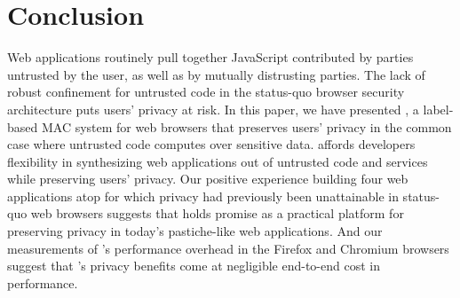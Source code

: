 \section{Conclusion}
\label{sec:conclusion}

Web applications routinely pull together JavaScript contributed by
parties untrusted by the user, as well as by mutually distrusting
parties.
The lack of robust confinement for untrusted code in the status-quo
browser security architecture puts users' privacy at risk.
In this paper, we have presented
\sys{}, a label-based MAC system for web browsers that preserves
users' privacy in the common case where untrusted code computes over
sensitive data. \sys{} affords developers flexibility in synthesizing
web applications out of untrusted code and services while preserving
users' privacy. Our positive experience building four web applications
atop \sys{} for which privacy had previously been unattainable in
status-quo web browsers suggests that \sys{} holds promise as a
practical platform for preserving privacy in today's pastiche-like web
applications. And our measurements of \sys{}'s performance overhead in
the Firefox and Chromium browsers suggest that \sys{}'s privacy
benefits come at negligible end-to-end cost in performance.

